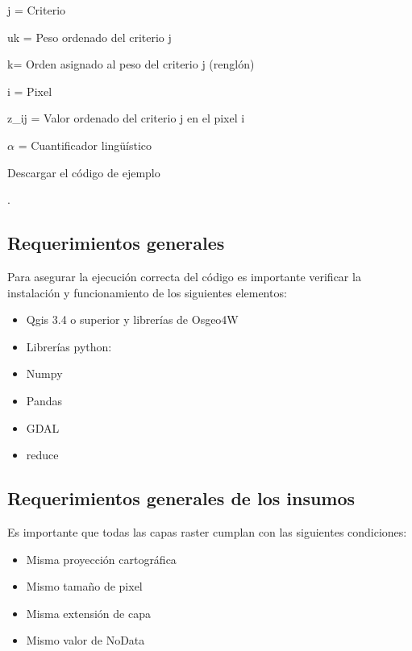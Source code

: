 \documentclass[letterpaper,10pt,spanish]{sphinxmanual}
\begin{document}
j = Criterio

uk = Peso ordenado del criterio j

k= Orden asignado al peso del criterio j (renglón)

i = Pixel

z\_ij = Valor ordenado del criterio j en el pixel i

\(\alpha\) = Cuantificador lingüístico

Descargar el código de ejemplo

.


\subsection{Requerimientos generales}
\label{\detokenize{owa:requerimientos-generales}}
Para asegurar la ejecución correcta del código es importante
verificar la instalación y funcionamiento de los siguientes elementos:
\begin{itemize}
\item {} 
Qgis 3.4 o superior y librerías de Osgeo4W

\item {} 
Librerías python:

\end{itemize}
\begin{itemize}
\item {} 
Numpy

\item {} 
Pandas

\item {} 
GDAL

\item {} 
reduce

\end{itemize}


\subsection{Requerimientos generales de los insumos}
\label{\detokenize{owa:requerimientos-generales-de-los-insumos}}
Es importante que todas las capas raster cumplan con las siguientes condiciones:
\begin{itemize}
\item {} 
Misma proyección cartográfica

\item {} 
Mismo tamaño de pixel

\item {} 
Misma extensión de capa

\item {} 
Mismo valor de NoData

\end{itemize}
\end{document}
